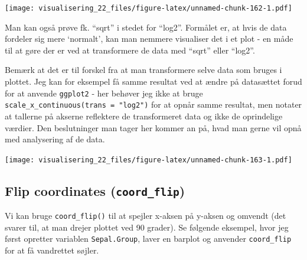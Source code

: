 \documentclass[
]{book}
\newenvironment{Shaded}{\begin{snugshade}}{\end{snugshade}}
\newcommand{\AttributeTok}[1]{\textcolor[rgb]{0.77,0.63,0.00}{#1}}
\newcommand{\DecValTok}[1]{\textcolor[rgb]{0.00,0.00,0.81}{#1}}
\newcommand{\FunctionTok}[1]{\textcolor[rgb]{0.00,0.00,0.00}{#1}}
\newcommand{\NormalTok}[1]{#1}
\newcommand{\OtherTok}[1]{\textcolor[rgb]{0.56,0.35,0.01}{#1}}
\newcommand{\SpecialCharTok}[1]{\textcolor[rgb]{0.00,0.00,0.00}{#1}}
\begin{document}
\texttt{[image: visualisering\_22\_files/figure-latex/unnamed-chunk-162-1.pdf]}

Man kan også prøve fk. ``sqrt'' i stedet for ``log2''. Formålet er, at hvis de data fordeler sig mere `normalt', kan man nemmere visualiser det i et plot - en måde til at gøre der er ved at transformere de data med ``sqrt'' eller ``log2''.

Bemærk at det er til forskel fra at man transformere selve data som bruges i plottet. Jeg kan for eksempel få samme resultat ved at ændre på datasættet forud for at anvende \texttt{ggplot2} - her behøver jeg ikke at bruge \texttt{scale\_x\_continuous(trans\ =\ "log2")} for at opnår samme resultat, men notater at tallerne på akserne reflektere de transformeret data og ikke de oprindelige værdier. Den beslutninger man tager her kommer an på, hvad man gerne vil opnå med analysering af de data.

\begin{Shaded}
\end{Shaded}

\texttt{[image: visualisering\_22\_files/figure-latex/unnamed-chunk-163-1.pdf]}

\hypertarget{flip-coordinates-coord_flip}{%
\subsection{\texorpdfstring{Flip coordinates (\texttt{coord\_flip})}{Flip coordinates (coord\_flip)}}\label{flip-coordinates-coord_flip}}

Vi kan bruge \texttt{coord\_flip()} til at spejler x-aksen på y-aksen og omvendt (det svarer til, at man drejer plottet ved 90 grader). Se følgende eksempel, hvor jeg først opretter variablen \texttt{Sepal.Group}, laver en barplot og anvender \texttt{coord\_flip} for at få vandrettet søjler.
\end{document}
